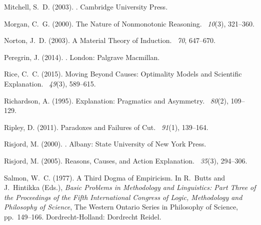 \documentclass[natbib]{svjour3}                     %
\begin{document}
\begin{thebibliography}{19}
Mitchell, S.~D. (2003).
.
\newblock Cambridge University Press.

Morgan, C.~G. (2000).
\newblock The Nature of Nonmonotonic Reasoning.
~{\em 10\/}(3), 321--360.

Norton, J.~D. (2003).
\newblock A Material Theory of Induction.
~{\em 70}, 647--670.

Peregrin, J. (2014).
.
\newblock London: Palgrave Macmillan.

Rice, C.~C. (2015).
\newblock Moving Beyond Causes: Optimality Models and Scientific Explanation.
~{\em 49\/}(3), 589--615.

Richardson, A. (1995).
\newblock Explanation: Pragmatics and Asymmetry.
~{\em 80\/}(2), 109--129.

Ripley, D. (2011).
\newblock Paradoxes and Failures of Cut.
~{\em 91\/}(1), 139--164.

Risjord, M. (2000).
.
\newblock Albany: State University of New York Press.

Risjord, M. (2005).
\newblock Reasons, Causes, and Action Explanation.
~{\em 35\/}(3), 294--306.

Salmon, W.~C. (1977).
\newblock A Third Dogma of Empiricism.
\newblock In R.~Butts and J.~Hintikka (Eds.), {\em Basic Problems in
  Methodology and Linguistics: Part Three of the Proceedings of the Fifth
  International Congress of Logic, Methodology and Philosophy of Science}, The
  Western Ontario Series in Philosophy of Science, pp.\  149--166.
  Dordrecht-Holland: Dordrecht Reidel.


\end{thebibliography}
\end{document}
